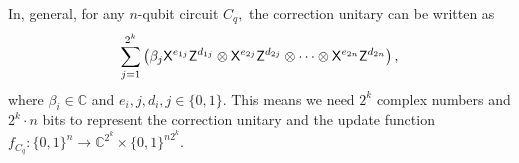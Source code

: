 In, general, for any $n$-qubit circuit $C_q,$  the correction unitary can be written as $$\sum_{j=1}^{2^k} \left(\beta_j {\sf X}^{e_{1j}}{\sf Z}^{d_{1j}}\otimes {\sf X}^{e_{2j}}{\sf Z}^{d_{2j}}\otimes \cdots  \otimes  {\sf X}^{e_{2n}}{\sf Z}^{d_{2n}}\right),$$
where $\beta_i\in \mathbb{C}$ and  $ e_i,j,d_i,j \in \{0,1\}.$  This means we need $2^k$ complex numbers and $2^k\cdot n$ bits to represent the correction unitary and the update function $f_{C_q}:\{0,1\}^n\longrightarrow \mathbb{C}^{2^k}\times \{0,1\}^{n2^{k}}.$
%
%
%
%
%



